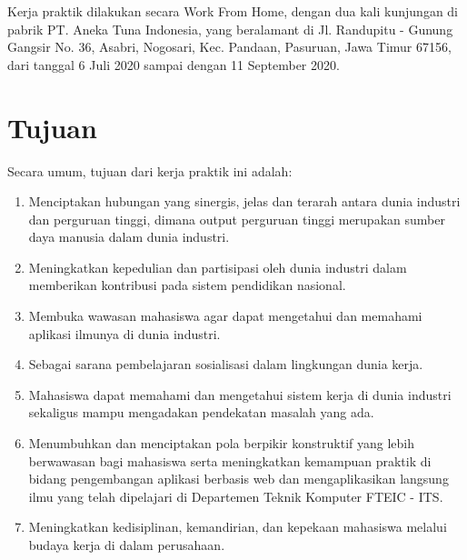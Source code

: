 Kerja praktik dilakukan secara Work From Home, dengan dua kali kunjungan di pabrik PT. Aneka Tuna Indonesia, yang beralamant di Jl. Randupitu - Gunung Gangsir No. 36, Asabri, Nogosari, Kec. Pandaan, Pasuruan, Jawa Timur 67156, dari tanggal 6 Juli 2020 sampai dengan 11 September 2020.
\vspace{0.5ex}

\section{Tujuan}
\vspace{1ex}

Secara umum, tujuan dari kerja praktik ini adalah:
\vspace{0.5ex}

\begin{enumerate}[nolistsep]

  \item Menciptakan hubungan yang sinergis, jelas dan terarah antara dunia industri dan perguruan tinggi, dimana output perguruan tinggi merupakan sumber daya manusia dalam dunia industri.
  \vspace{0.5ex}

  \item Meningkatkan kepedulian dan partisipasi oleh dunia industri dalam memberikan kontribusi pada sistem pendidikan nasional.
  \vspace{0.5ex}

  \item Membuka wawasan mahasiswa agar dapat mengetahui dan memahami aplikasi ilmunya di dunia industri.
  \vspace{0.5ex}

  \item Sebagai sarana pembelajaran sosialisasi dalam lingkungan dunia kerja.
  \vspace{0.5ex}

  \item Mahasiswa dapat memahami dan mengetahui sistem kerja di dunia industri sekaligus mampu mengadakan pendekatan masalah yang ada.
  \vspace{0.5ex}

  \item Menumbuhkan dan menciptakan pola berpikir konstruktif yang lebih berwawasan bagi mahasiswa serta meningkatkan kemampuan praktik di bidang pengembangan aplikasi berbasis web dan mengaplikasikan langsung ilmu yang telah dipelajari di Departemen Teknik Komputer FTEIC - ITS.
  \vspace{0.5ex}

  \item Meningkatkan kedisiplinan, kemandirian, dan kepekaan mahasiswa melalui budaya kerja di dalam perusahaan.
  \vspace{0.5ex}

\end{enumerate}
\vspace{0.5ex}

